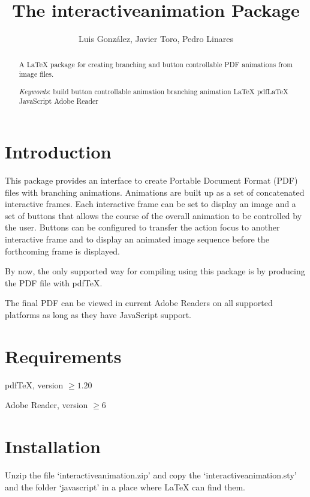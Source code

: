 \documentclass[a4paper,12pt]{article}
\def\keywords{build button controllable animation branching animation LaTeX pdfLaTeX JavaScript Adobe Reader}
\begin{document}
\title{The {\sffamily interactiveanimation} Package}
\author{Luis Gonz\'alez, Javier Toro, Pedro Linares}
\maketitle

\begin{abstract}\noindent
A \LaTeX{} package for creating branching and button controllable PDF animations from image files.
\baselineskip

\emph{Keywords}: \keywords
\end{abstract}

\tableofcontents

\section{Introduction}
This package provides an interface to create Portable Document Format (PDF) files with branching animations. Animations are built up as a set of concatenated interactive frames. Each interactive frame can be set to display an image and a set of buttons that allows the course of the overall animation to be controlled by the user. Buttons can be configured to transfer the action focus to another interactive frame and to display an animated image sequence before the forthcoming frame is displayed.

By now, the only supported way for compiling using this package is by producing the PDF file with pdf\TeX{}.

The final PDF can be viewed in current Adobe Readers on all supported platforms as long as they have JavaScript support.

\section{Requirements}
\begin{trivlist}
\item pdf\TeX{}, version $\ge1.20$
\item Adobe Reader, version $\ge6$
\end{trivlist}

\section{Installation}
Unzip the file `interactiveanimation.zip' and copy the `interactiveanimation.sty' and the folder `javascript' in a place where \LaTeX{} can find them.
\end{document}
